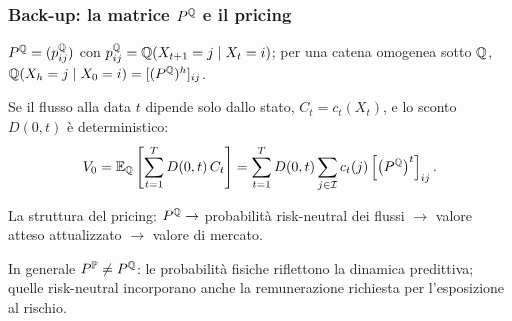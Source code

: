 \begin{frame}%
%

\frametitle{Back-up: la matrice $P^{\mathbb{Q}}$ e il pricing}%
%

%


$P^{\mathbb{Q}}=(p_{ij}^{\mathbb{Q}})$ con $p_{ij}^{\mathbb{Q}}=\mathbb{Q}(X_{t+1}=j\mid X_{t}=i)$; per una
catena omogenea sotto $\mathbb{Q}$, $\mathbb{Q}(X_{h}=j\mid X_{0}=i)=[(P^{\mathbb{Q}})^{h}]_{ij}$.

\medskip

Se il flusso alla data $t$ dipende solo dallo stato, $C_{t}=c_{t}(X_{t})$, e
lo sconto $D(0,t)$ \`{e} deterministico:
\[
V_{0} = \mathbb{E}_{\mathbb{Q}}\left[  \sum_{t=1}^{T}D(0,t)\,C_{t}\right]  = \sum_{t=1}^{T}
D(0,t) \sum_{j\in\mathcal{I}} c_{t}(j) \left[  \left(  P^{\mathbb{Q}}\right)
^{t}\right]  _{ij}.
\]


\medskip

\begin{stepitemize}
\item La struttura del pricing: $P^{\mathbb{Q}}\rightarrow$ probabilit\`{a}
risk-neutral dei flussi $\rightarrow$ valore atteso attualizzato $\rightarrow$
valore di mercato.

\item In generale $P^{\mathbb{P}}\neq P^{\mathbb{Q}}$: le probabilit\`{a} fisiche
riflettono la dinamica predittiva; quelle risk-neutral incorporano anche la
remunerazione richiesta per l'esposizione al rischio.
\end{stepitemize}

%

\transboxout
\end{frame}%


%

